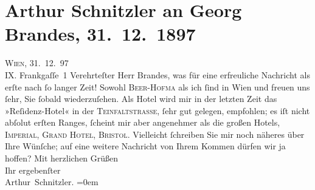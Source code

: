 

               \section[Arthur Schnitzler an Georg Brandes, 31. 12. 1897]{ Arthur Schnitzler an Georg Brandes, 31. 12. 1897}\nopagebreak{}\rehead{ }\begin{ledgroupsized}[t]{13cm}\normalsize\beginnumbering{} \toendnotes[C]{\smallbreak\pagebreak[2]} 
\pstart
           \raggedleft{}{\pb}\textsc{Wien}, 31. 12. 97{\\}IX. Frankgaſſe 1\pend
           \pstart{}Verehrteſter Herr Brandes,\pend\pstart
           was für eine erfreuliche Nachricht als erſte nach ſo langer Zeit! Sowohl
                        \textsc{Beer-Hofma{\geminationn}} als ich ſind in Wien und freuen uns ſehr, Sie ſobald wiederzuſehen. Als Hotel wird mir
                    in {\pb}der letzten Zeit das »Reſidenz-Hotel« in der \textsc{Teinfaltstraße}, ſehr gut gelegen, empfohlen; es iſt nicht abſolut erſten Ranges,
                    ſcheint mir aber angenehmer als die großen Hotels, \textsc{Imperial}, \textsc{Grand Hotel}, \textsc{Bristol}. Vielleicht ſchreiben Sie mir noch näheres {\pb}über Ihre Wünſche; auf eine weitere
                    Nachricht von Ihrem Kommen dürfen wir ja hoffen?\pend
           \pstart
           Mit herzlichen Grüßen{\\[\baselineskip]}Ihr ergebenſter{\\[\baselineskip]}\spacefill\mbox{Arthur Schnitzler.}\pend
           \leftskip=0em{}\endnumbering{}\end{ledgroupsized}  \newcommand{\dateiname}{L00757}\newcommand{\titel}{Arthur Schnitzler an Georg Brandes, 31. 12. 1897}\newcommand{\editorInnen}{Martin Anton Müller und Gerd-Hermann Susen}
      